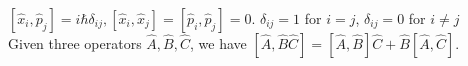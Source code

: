 $[\widehat{x}_i, \widehat{p}_j ] = i \hbar \delta_{ij}, [\widehat{x}_i, \widehat{x}_j] = [\widehat{p}_i, \widehat{p}_j] = 0$. $\delta_{ij} = 1$ for $i=j$, $\delta_{ij} = 0$ for $i \neq j$ \\

Given three operators $\widehat{A}, \widehat{B}, \widehat{C}$, we have $[\widehat{A}, \widehat{B}\widehat{C}] = [\widehat{A}, \widehat{B}] \widehat{C} + \widehat{B} [\widehat{A}, \widehat{C}]$.



